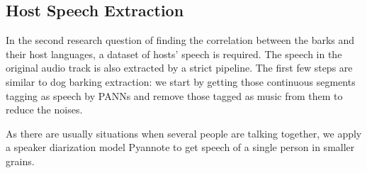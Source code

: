 \subsection{Host Speech Extraction}
In the second research question of finding the correlation between the barks and their host languages, a dataset of hosts' speech is required. The speech in the original audio track is also extracted by a strict pipeline. The first few steps are similar to dog barking extraction: we start by getting those continuous segments tagging as speech by PANNs and remove those tagged as music from them to reduce the noises.

As there are usually situations when several people are talking together, we apply a speaker diarization model Pyannote\cite{Bredin2020, Bredin2021} to get speech of a single person in smaller grains.

